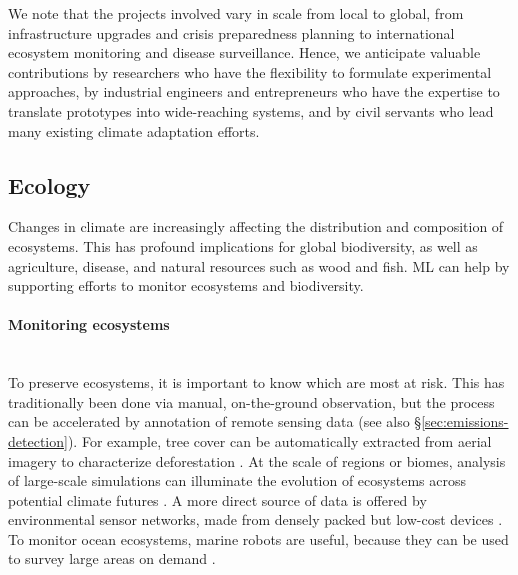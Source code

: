 \documentclass[11pt]{report}
\newcommand{\Gap}{\texorpdfstring{\hfill}{}}
\newcommand{\Rec}{\texorpdfstring{{\small\emph{\color{blue}{\fbox{High Leverage}}}}}{}}
\begin{document}
We note that the projects involved vary in scale from local to global, from infrastructure upgrades
and crisis preparedness planning to international ecosystem monitoring and
disease surveillance. Hence, we anticipate valuable contributions by
researchers who have the flexibility to formulate experimental
approaches, by industrial engineers and entrepreneurs who have the expertise to
translate prototypes into wide-reaching systems, and by civil servants who lead
many existing climate adaptation efforts.

\subsection{Ecology}
\label{subsub:ecology}

Changes in climate are increasingly affecting the distribution and composition of ecosystems. This has profound implications for global biodiversity, as well as agriculture, disease, and natural resources such as wood and fish.
ML can  help by supporting efforts to monitor ecosystems and biodiversity.

\paragraph*{Monitoring ecosystems}\Gap\textbf{\Rec}\mbox{}\\ To preserve
ecosystems, it is important to know which are most at risk. This has
traditionally been done via manual, on-the-ground observation, but the process
can be accelerated by annotation of remote sensing data
\cite{potter2008terrestrial,boriah2008land,malkin2018label,bragilevsky2017deep} (see also \S\ref{sec:emissions-detection}). For example,
tree cover can be automatically extracted from aerial imagery to characterize
deforestation \cite{mcdowell2015global, huynh2018annotation}. At the scale of
regions or biomes, analysis of large-scale simulations can illuminate the
evolution of ecosystems across potential climate futures
\cite{klausmeyer2009climate, feng2018improving}. A more direct source of data is
offered by environmental sensor networks, made from densely packed but low-cost
devices \cite{hart2006environmental, dietterich2009machine, hut2012tahmo}. To
monitor ocean ecosystems, marine robots are useful, because they can be used to
survey large areas on demand \cite{griffiths1998towards, dunbabin2012robots}.
\end{document}
